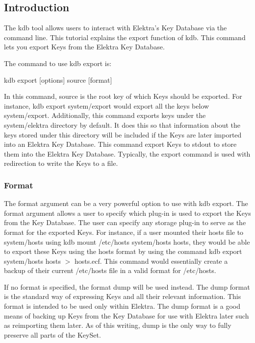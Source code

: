 \subsection*{Introduction}

The kdb tool allows users to interact with Elektra's Key Database via the command line. This tutorial explains the export function of kdb. This command lets you export Keys from the Elektra Key Database.

The command to use kdb export is\+: \begin{DoxyVerb}kdb export [options] source [format]
\end{DoxyVerb}


In this command, source is the root key of which Keys should be exported. For instance, {\ttfamily kdb export system/export} would export all the keys below system/export. Additionally, this command exports keys under the system/elektra directory by default. It does this so that information about the keys stored under this directory will be included if the Keys are later imported into an Elektra Key Database. This command export Keys to stdout to store them into the Elektra Key Database. Typically, the export command is used with redirection to write the Keys to a file.

\subsubsection*{Format}

The format argument can be a very powerful option to use with kdb export. The format argument allows a user to specify which plug-\/in is used to export the Keys from the Key Database. The user can specify any storage plug-\/in to serve as the format for the exported Keys. For instance, if a user mounted their hosts file to system/hosts using {\ttfamily kdb mount /etc/hosts system/hosts hosts}, they would be able to export these Keys using the hosts format by using the command {\ttfamily kdb export system/hosts hosts $>$ hosts.\+ecf}. This command would essentially create a backup of their current /etc/hosts file in a valid format for /etc/hosts.

If no format is specified, the format {\ttfamily dump} will be used instead. The dump format is the standard way of expressing Keys and all their relevant information. This format is intended to be used only within Elektra. The dump format is a good means of backing up Keys from the Key Database for use with Elektra later such as reimporting them later. As of this writing, dump is the only way to fully preserve all parts of the Key\+Set.

